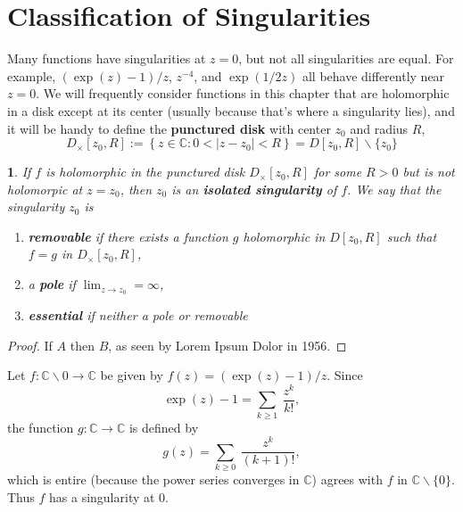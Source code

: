 \documentclass{article}
\theoremstyle{marginlab}
\newtheorem{margindef}{\color{accol}{Definition}}
\numberwithin{margindef}{section}
\theoremstyle{marginlab}
\numberwithin{marginthm}{section}
\begin{document}
\section{Classification of Singularities}

Many functions have singularities at $z=0$, but not all singularities are equal.
For example, $(\exp(z)-1)/z$, $z^{-4}$, and $\exp({1/2z})$ all behave differently
near $z=0$.
We will frequently consider functions in this chapter that are holomorphic in a
disk except at its center (usually because that’s where a singularity lies), and
it will be handy to define the \textbf{punctured disk} with center $z_0$ and radius $R$,
\[ D_\times [z_0, R] := \left\{ z \in \mathbb{C}  : 0 < |z-z_0| < R\right\}  = D[z_0,R] \backslash \{z_0\} \]


\begin{margindef} 
	If $f$ is holomorphic in the punctured disk $D_\times[z_0, R]$ for some $R>0$
	but is not holomorpic at $z=z_0$, then $z_0$ is an
	\textbf{isolated singularity} of $f$. We say that the singularity $z_0$ is
	\begin{enumerate}[label=(\alph*)]
		\item \textbf{removable} if there exists a function $g$ holomorphic in $D[z_0,R]$
			such that $f=g$ in $D_\times[z_0, R]$, 
		\item a \textbf{pole} if $\displaystyle\lim_{z\to z_0} = \infty$, 
		\item \textbf{essential} if neither a pole or removable
\end{enumerate}
\end{margindef}
\begin{proof}
	If $A$ then $B$, as seen by Lorem Ipsum Dolor in 1956.
\end{proof}


\begin{cexamp}\label{ex:powers}
	Let $f: \mathbb{C} \backslash {0} \to \mathbb{C}$ be given by $f(z) = (\exp(z)-1)/z$.
	Since 
	\[ \exp(z)-1 = \sum_{k\geq 1}\  \frac{z^k}{k!}, \]
	the function $g:\mathbb{C} \to \mathbb{C}$ is defined by
	\[ g(z) = \sum_{k\geq 0}\  \frac{z^k}{(k+1)!}, \]
	which is entire (because the power series converges in $\mathbb{C}$) agrees with $f$ in
	$\mathbb{C}\backslash \{0\}$. Thus $f$ has a singularity at $0$.

\end{cexamp}
\end{document}
